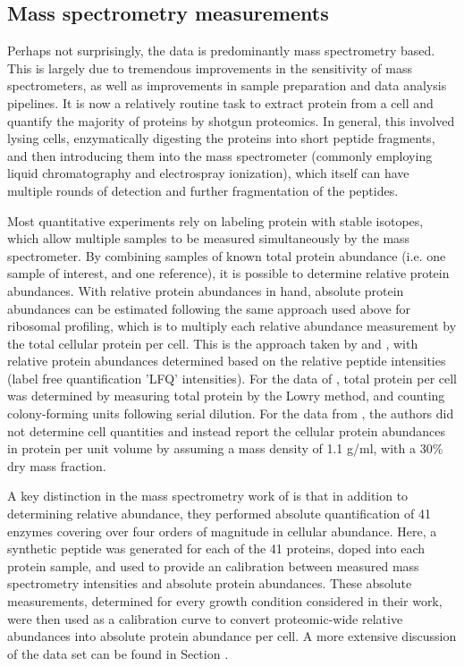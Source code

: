 \subsection{Mass spectrometry measurements}

Perhaps not surprisingly, the data is predominantly mass spectrometry based. This is
largely due to tremendous improvements in the sensitivity of mass spectrometers,
as well as improvements in sample preparation and data analysis
pipelines. It is now a relatively routine task to extract protein from a cell
and quantify the majority of proteins by shotgun proteomics. In general, this
involved lysing cells, enzymatically digesting the proteins into short peptide
fragments, and then introducing them into the mass spectrometer (commonly
employing liquid chromatography and electrospray ionization), which itself can
have multiple rounds of detection and further fragmentation of the peptides.

Most quantitative experiments rely on labeling protein with stable isotopes,
which allow multiple samples to be measured simultaneously by the mass
spectrometer. By combining samples of known total protein abundance (i.e. one
sample of interest, and one reference), it is possible to determine relative
protein abundances. With relative protein abundances in hand, absolute protein
abundances can be estimated following the same approach used above for ribosomal
profiling, which is to multiply each relative abundance measurement by the total
cellular protein per cell. This is the approach taken by \cite{valgepea2013} and
\cite{peebo2015}, with relative protein abundances determined based on the
relative peptide intensities (label free quantification 'LFQ' intensities). For
the data of \cite{valgepea2013}, total protein per cell was determined by
measuring  total protein by the Lowry method, and counting colony-forming units
following serial dilution. For the data from   \cite{peebo2015}, the authors did
not determine  cell quantities and instead report the cellular protein
abundances in protein per unit  volume by assuming a mass density of 1.1 g/ml,
with a 30\% dry mass fraction.

A key distinction in the mass spectrometry work of \cite{schmidt2016} is that in
addition to determining relative abundance, they performed absolute
quantification of  41 enzymes covering over four orders of magnitude in cellular
abundance. Here,  a synthetic peptide was generated for each of the 41 proteins,
doped into each protein sample, and used to provide an calibration between
measured mass spectrometry intensities and absolute protein abundances. These
absolute measurements, determined for every growth condition considered in their
work,   were then used as a calibration curve to convert proteomic-wide relative
abundances into  absolute protein abundance per cell. A more extensive
discussion of the \cite{schmidt2016} data set can be found in Section
 .

